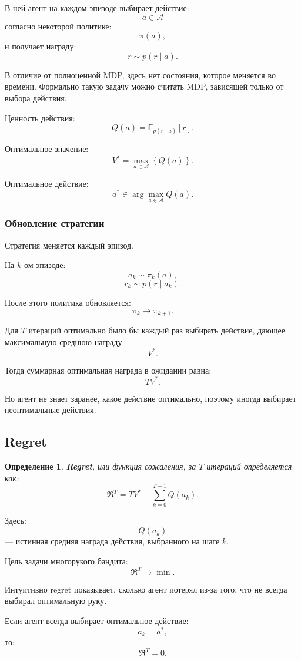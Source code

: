 \documentclass[12pt,a4paper]{article}
\newtheorem{definition}{Определение}
\begin{document}
В ней агент на каждом эпизоде выбирает действие:
\[
a\in\mathcal A
\]
согласно некоторой политике:
\[
\pi(a),
\]
и получает награду:
\[
r\sim p(r\mid a).
\]

В отличие от полноценной MDP, здесь нет состояния, которое меняется во времени. Формально такую задачу можно считать MDP, зависящей только от выбора действия.

Ценность действия:
\[
Q(a)
=
\mathbb E_{p(r\mid a)}
\left[
r
\right].
\]

Оптимальное значение:
\[
V^\ast
=
\max_{a\in\mathcal A}
\left\{
Q(a)
\right\}.
\]

Оптимальное действие:
\[
a^\ast
\in
\arg\max_{a\in\mathcal A}
Q(a).
\]

\subsubsection{Обновление стратегии}

Стратегия меняется каждый эпизод.

На $k$-ом эпизоде:
\[
a_k\sim \pi_k(a),
\]
\[
r_k\sim p(r\mid a_k).
\]

После этого политика обновляется:
\[
\pi_k
\longrightarrow
\pi_{k+1}.
\]

Для $T$ итераций оптимально было бы каждый раз выбирать действие, дающее максимальную среднюю награду:
\[
V^\ast.
\]

Тогда суммарная оптимальная награда в ожидании равна:
\[
T V^\ast.
\]

Но агент не знает заранее, какое действие оптимально, поэтому иногда выбирает неоптимальные действия.

\subsection{Regret}

\begin{definition}
\textbf{Regret}, или функция сожаления, за $T$ итераций определяется как:
\[
\mathfrak R^T
=
T V^\ast
-
\sum_{k=0}^{T-1}
Q(a_k).
\]
\end{definition}

Здесь:
\[
Q(a_k)
\]
--- истинная средняя награда действия, выбранного на шаге $k$.

Цель задачи многорукого бандита:
\[
\mathfrak R^T
\to
\min.
\]

Интуитивно regret показывает, сколько агент потерял из-за того, что не всегда выбирал оптимальную руку.

Если агент всегда выбирает оптимальное действие:
\[
a_k=a^\ast,
\]
то:
\[
\mathfrak R^T=0.
\]
\end{document}
